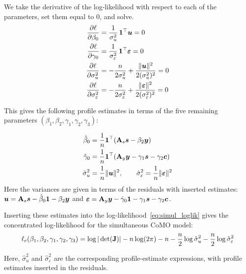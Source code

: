 We take the derivative of the log-likelihood with respect to each of the parameters, set them equal to $0$, and solve.
\begin{align}
    \frac{\partial \ell}{\partial \beta_0}
    &= \frac{1}{\sigma_u^2}\,\bm{1}^\top\bm{u} = 0 \\
    \frac{\partial \ell}{\partial \gamma_0}
    &= \frac{1}{\sigma_\varepsilon^2}\,\bm{1}^\top\bm{\varepsilon} = 0 \\
    \frac{\partial \ell}{\partial \sigma_u^2}
    &= -\frac{n}{2\sigma_u^2} + \frac{\|\bm{u}\|^2}{2(\sigma_u^2)^2} = 0 \\
    \frac{\partial \ell}{\partial \sigma_\varepsilon^2}
    &= -\frac{n}{2\sigma_\varepsilon^2} + \frac{\|\bm{\varepsilon}\|^2}{2(\sigma_\varepsilon^2)^2} = 0
\end{align}

This gives the following profile estimates in terms of the five remaining parameters $(\beta_1, \beta_2, \gamma_1, \gamma_2, \gamma_3)$:

\begin{align}
    \hat{\beta}_0 &= \frac{1}{n}\bm{1}^\top(\mathbf{A}_s\bm{s} - \beta_2\bm{y}) \\
    \hat{\gamma}_0 &= \frac{1}{n}\bm{1}^\top(\mathbf{A}_y\bm{y} - \gamma_1\bm{s} - \gamma_2\bm{c}) \\
    \hat{\sigma}_u^2 &= \frac{1}{n}\|\bm{u}\|^2, \qquad
    \hat{\sigma}_\varepsilon^2 = \frac{1}{n}\|\bm{\varepsilon}\|^2
\end{align}
Here the variances are given in terms of the residuals with inserted estimates: $\bm{u} = \mathbf{A}_s\bm{s} - \hat{\beta}_0\bm{1} - \beta_2\bm{y}$ and $\bm{\varepsilon} = \mathbf{A}_y\bm{y} - \hat{\gamma}_0\bm{1} - \gamma_1\bm{s} - \gamma_2\bm{c}$.

Inserting these estimates into the log-likelihood~\eqref{eq:simul_loglik} gives the concentrated log-likelihood for the simultaneous CoMO model:
\begin{equation}
\label{eq:simul_conc_loglik}
    \ell_c(\beta_1, \beta_2, \gamma_1, \gamma_2, \gamma_3) = \log|\det(\mathbf{J})|
    - n\log(2\pi) - n
    - \frac{n}{2}\log\hat{\sigma}_u^2 - \frac{n}{2}\log\hat{\sigma}_\varepsilon^2
\end{equation}

Here, $\hat{\sigma}_u^2$ and $\hat{\sigma}_\varepsilon^2$ are the corresponding profile-estimate expressions, with profile estimates inserted in the residuals.

